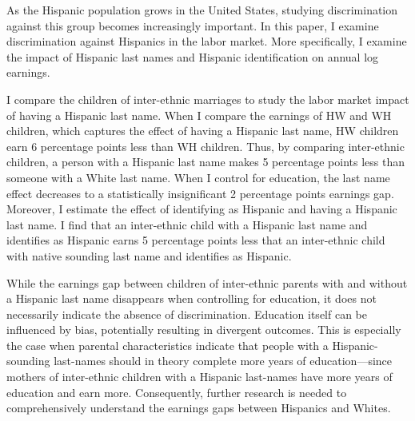 \documentclass[12pt,english]{article}
\begin{document}
As the Hispanic population grows in the United States, studying discrimination against this group becomes increasingly important. In this paper, I examine discrimination against Hispanics in the labor market. More specifically, I examine the impact of Hispanic last names and Hispanic identification on annual log earnings. 

I compare the children of inter-ethnic marriages to study the labor market impact of having a Hispanic last name. When I compare the earnings of HW and WH children, which captures the effect of having a Hispanic last name, HW children earn  6 percentage points less than WH children. Thus, by comparing inter-ethnic children, a person with a Hispanic last name makes 5 percentage points less than someone with a White last name. When I control for education, the last name effect decreases to a statistically insignificant 2 percentage points earnings gap. Moreover, I estimate the effect of identifying as Hispanic and having a Hispanic last name. I find that an inter-ethnic child with a Hispanic last name and identifies as Hispanic earns 5 percentage points less that an inter-ethnic child with native sounding last name and identifies as Hispanic. 

While the earnings gap between children of inter-ethnic parents with and without a Hispanic last name disappears when controlling for education, it does not necessarily indicate the absence of discrimination. Education itself can be influenced by bias, potentially resulting in divergent outcomes. This is especially the case when parental characteristics indicate that people with a Hispanic-sounding last-names should in theory complete more years of education---since mothers of inter-ethnic children with a Hispanic last-names have more years of education and earn more. Consequently, further research is needed to comprehensively understand the earnings gaps between Hispanics and Whites.


\pagebreak
\begingroup
{}
\setlength\bibitemsep{0pt}
\printbibliography
\endgroup
\pagebreak
\end{document}
